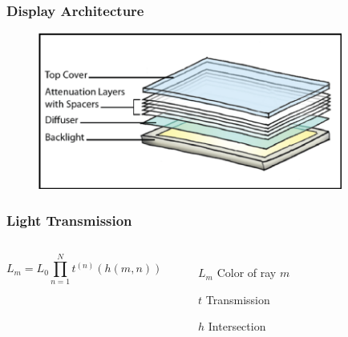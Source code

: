 \documentclass[12pt, compress]{beamer}
\begin{document}
\begin{frame}[fragile]
	\frametitle{Display Architecture}
	
	\begin{figure}
		\includegraphics[width=10cm]{images/display_architecture.png}
		\caption*{\cite{WetzsteinTomo}}	
	\end{figure}
\end{frame}

\begin{frame}[fragile]
	\frametitle{Light Transmission}
	\vspace{1cm}
	\begin{columns}[onlytextwidth]
			
			\begin{equation*}
				L_m = L_0 \prod_{n=1}^{N} t^{(n)} (h(m, n)) 
			\end{equation*}
			\begin{itemize}[<alert@+>]
			    \item[$L_m$] Color of ray $m$
			    \item[$t$] Transmission
			    \item[$h$] Intersection 
			\end{itemize}
	\end{columns}
	\vspace{1cm}
	\begin{center}
	\end{center}
\end{frame}
\end{document}
